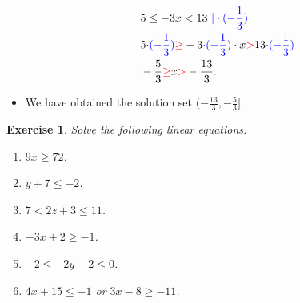\documentclass[12pt]{article}
\newtheorem{ex}{Exercise}[section]
\begin{document}
\begin{itemize}
\begin{equation*}
\begin{split}
& 5\leq -3x<13 \textcolor{blue}{\ |\cdot (-\frac{1}{3})}\\
& 5 \textcolor{blue}{\cdot (-\frac{1}{3})}\textcolor{red}{\geq} -3 \textcolor{blue}{\cdot (-\frac{1}{3})}\cdot x\textcolor{red}{>}13 \textcolor{blue}{\cdot (-\frac{1}{3})}\\
&-\frac{5}{3}\textcolor{red}{\geq} x\textcolor{red}{>}-\frac{13}{3}.
\end{split}
\end{equation*}
\item We have obtained the solution set $(-\frac{13}{3}, -\frac{5}{3}]$. 
\end{itemize}

\begin{ex}
Solve the following linear equations.
\begin{multicols}{2}
\begin{enumerate}
\item[a)] $9x\geq 72$.
\item[b)] $y+7\leq -2$.
\item[c)] $7<2z+3\leq 11$.
\item[d)] $-3x+2\geq -1$.
\item[e)] $-2\leq -2y-2\leq 0$.
\item[f)]  $4x+15\leq -1$ or $3x-8\geq -11$.
\end{enumerate}
\end{multicols}
\end{ex}
\end{document}
